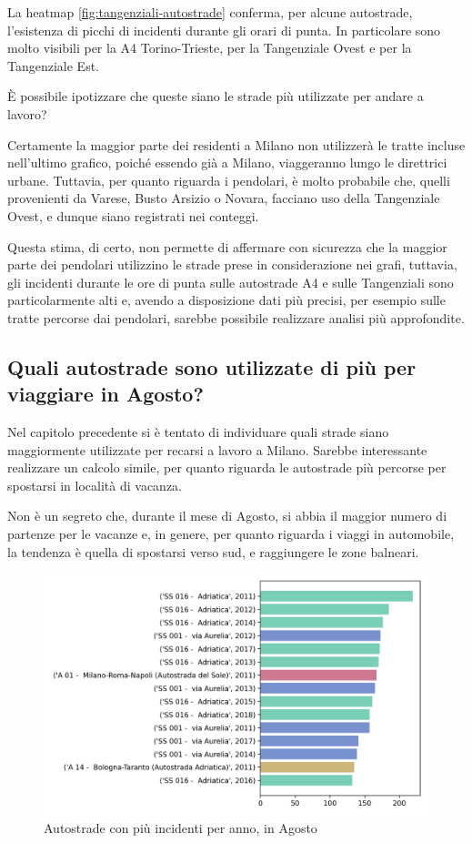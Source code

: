 \documentclass[a4paper,12pt]{report}
\begin{document}
La heatmap \ref{fig:tangenziali-autostrade} conferma, per alcune autostrade, 
l'esistenza di picchi di incidenti durante gli orari di punta. 
In particolare sono molto visibili per la A4 Torino-Trieste, 
per la Tangenziale Ovest e per la Tangenziale Est. 

\`E possibile ipotizzare che queste siano le strade più utilizzate per 
andare a lavoro? 

Certamente la maggior parte dei residenti a Milano non utilizzerà le tratte incluse 
nell'ultimo grafico, poiché essendo già a Milano, viaggeranno lungo le direttrici urbane. 
Tuttavia, per quanto riguarda i pendolari, è molto probabile che, quelli provenienti 
da Varese, Busto Arsizio o Novara, facciano uso della Tangenziale Ovest, 
e dunque siano registrati nei conteggi. 

Questa stima, di certo, non permette di affermare con sicurezza 
che la maggior parte dei pendolari utilizzino le strade prese in considerazione 
nei grafi, 
tuttavia, gli incidenti durante le ore di punta sulle autostrade A4 e sulle 
Tangenziali sono particolarmente alti e, avendo a disposizione dati più 
precisi, per esempio sulle tratte percorse dai pendolari, sarebbe possibile 
realizzare analisi più approfondite. 

\subsection{Quali autostrade sono utilizzate di più per viaggiare in Agosto?}

Nel capitolo precedente si è tentato di individuare quali strade siano maggiormente 
utilizzate per recarsi a lavoro a Milano. 
Sarebbe interessante realizzare un calcolo simile, per quanto riguarda le autostrade 
più percorse per spostarsi in località di vacanza. 

Non è un segreto che, durante il mese di Agosto, si abbia il maggior numero di 
partenze per le vacanze e, in genere, per quanto riguarda i viaggi 
in automobile, la tendenza è quella di spostarsi verso sud, 
e raggiungere le zone balneari. 

\begin{figure}
    \includegraphics[width=\linewidth]{../src/incidenti/incidenti_aci/agosto/autostrade_anno_agosto.png}
    \caption{Autostrade con più incidenti per anno, in Agosto}
    \label{fig:autostrade-anno-agosto}
\end{figure}
\end{document}
